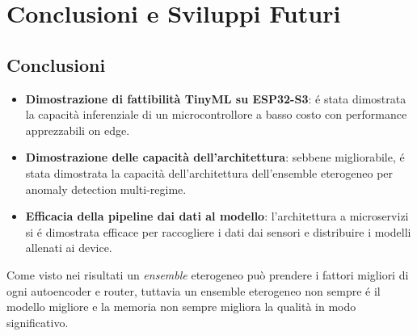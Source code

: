 \chapter{Conclusioni e Sviluppi Futuri}

\section{Conclusioni}
\begin{itemize}
	\item \textbf{Dimostrazione di fattibilità TinyML su ESP32-S3}: é stata dimostrata la capacità inferenziale di un microcontrollore a basso costo con performance apprezzabili on edge. 
	\item \textbf{Dimostrazione delle capacità dell'architettura}: sebbene migliorabile, é stata dimostrata la capacità dell'architettura dell'ensemble eterogeneo per anomaly detection multi-regime.
	\item \textbf{Efficacia della pipeline dai dati al modello}: l'architettura a microservizi si é dimostrata efficace per raccogliere i dati dai sensori e distribuire i modelli allenati ai device.
\end{itemize}



Come visto nei risultati un \textit{ensemble} eterogeneo può prendere i fattori migliori di ogni autoencoder e router, tuttavia un ensemble eterogeneo non sempre é il modello migliore e la memoria non sempre migliora la qualità in modo significativo.

